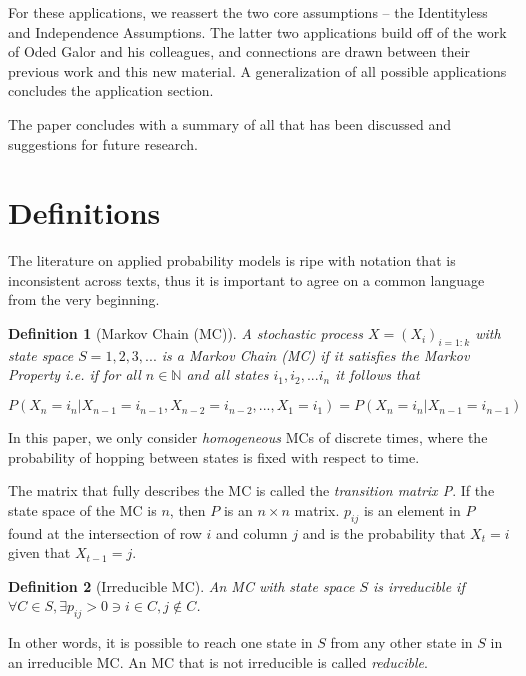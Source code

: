 \documentclass{article}
\newtheorem{defn}{Definition}
\begin{document}
For these applications, we reassert the two core assumptions -- the Identityless and Independence Assumptions. The latter two applications build off of the work of Oded Galor and his colleagues, and connections are drawn between their previous work and this new material. A generalization of all possible applications concludes the application section.

The paper concludes with a summary of all that has been discussed and suggestions for future research.

\section{Definitions}
The literature on applied probability models is ripe with notation that is inconsistent across texts, thus it is important to agree on a common language from the very beginning.

\begin{defn}[Markov Chain (MC)]
    A stochastic process $X = (X_i)_{i=1:k}$ with state space $S = {1,2,3,...}$ is a Markov Chain (MC) if it satisfies the Markov Property i.e. if for all $n \in \mathbb{N}$ and all states $i_1,i_2,...i_n$ it follows that

    \[
    P(X_n=i_n | X_{n-1}=i_{n-1}, X_{n-2}=i_{n-2}, ..., X_1 = i_1) = P(X_n=i_n | X_{n-1}=i_{n-1})
    \]
\end{defn}

\cite{IowaThesis}

In this paper, we only consider \textit{homogeneous} MCs of discrete times, where the probability of hopping between states is fixed with respect to time.

The matrix that fully describes the MC is called the \textit{transition matrix P}. If the state space of the MC is $n$, then $P$ is an $n \times n$ matrix. $p_{ij}$ is an element in $P$ found at the intersection of row $i$ and column $j$ and is the probability that $X_t = i$ given that $X_{t-1} = j$.

\begin{defn}[Irreducible MC]
    An MC with state space $S$ is irreducible if $\forall C \in S, \exists p_{ij} > 0 \ni i \in C, j \notin C$.
\end{defn}

In other words, it is possible to reach one state in $S$ from any other state in $S$ in an irreducible MC. An MC that is not irreducible is called \textit{reducible}.
\end{document}

